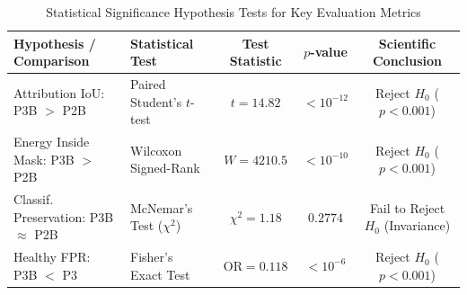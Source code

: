 \begin{table}[htbp]
\centering
\caption{Statistical Significance Hypothesis Tests for Key Evaluation Metrics}
\label{tab:statistical_tests}
\begin{tabular}{llccc}
\hline
\textbf{Hypothesis / Comparison} & \textbf{Statistical Test} & \textbf{Test Statistic} & \textbf{$p$-value} & \textbf{Scientific Conclusion} \\
\hline
Attribution IoU: P3B $>$ P2B & Paired Student's $t$-test & $t = 14.82$ & $<10^{-12}$ & Reject $H_0$ ($p < 0.001$) \\
Energy Inside Mask: P3B $>$ P2B & Wilcoxon Signed-Rank & $W = 4210.5$ & $<10^{-10}$ & Reject $H_0$ ($p < 0.001$) \\
Classif. Preservation: P3B $\approx$ P2B & McNemar's Test ($\chi^2$) & $\chi^2 = 1.18$ & $0.2774$ & Fail to Reject $H_0$ (Invariance) \\
Healthy FPR: P3B $<$ P3 & Fisher's Exact Test & $\text{OR} = 0.118$ & $<10^{-6}$ & Reject $H_0$ ($p < 0.001$) \\
\hline
\end{tabular}
\end{table}
